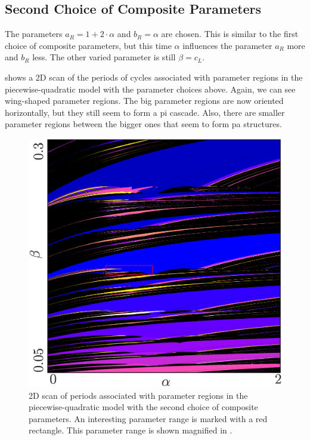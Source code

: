 \clearpage
\subsection{Second Choice of Composite Parameters}

The parameters $a_R = 1 + 2 \cdot \alpha$ and $b_R = \alpha$ are chosen.
This is similar to the first choice of composite parameters, but this time $\alpha$ influences the parameter $a_R$ more and $b_R$ less.
The other varied parameter is still $\beta = c_L$.

 shows a 2D scan of the periods of cycles associated with parameter regions in the piecewise-quadratic model with the parameter choices above.
Again, we can see wing-shaped parameter regions.
The big parameter regions are now oriented horizontally, but they still seem to form a \gls{pi} cascade.
Also, there are smaller parameter regions between the bigger ones that seem to form \gls{pa} structures.

\begin{figure}
	\centering
	\includegraphics[width=.7 \textwidth]{../Figures/A/A.4/result.png}
	\caption[2D scan of periods associated with parameter regions in the piecewise-quadratic model with the second choice of composite parameters]{
		2D scan of periods associated with parameter regions in the piecewise-quadratic model with the second choice of composite parameters.
		An interesting parameter range is marked with a red rectangle.
		This parameter range is shown magnified in .
	}
	\label{fig:app.model.quad.second}
\end{figure}

\clearpage
